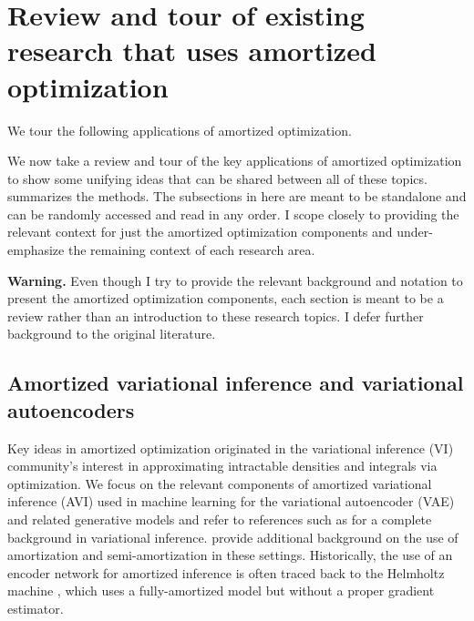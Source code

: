 \documentclass[twoside,11pt]{article}
\begin{document}
\section{Review and tour of existing research that uses amortized optimization}
\label{sec:apps}

\begin{table}[t]
  \caption{We tour the following applications of amortized optimization.}
  \vspace{3mm}
  
  \label{tab:rw}
\end{table}

We now take a review and tour of the key applications
of amortized optimization to show some unifying ideas
that can be shared between all of these topics.
 summarizes the methods.
The subsections in here are meant to be standalone
and can be randomly accessed and read in any order.
I scope closely to providing the relevant context for
just the amortized optimization components and
under-emphasize the remaining context of each research area.

\textbf{Warning.}
Even though I try to provide the relevant background and notation to
present the amortized optimization components, each section is
meant to be a review rather than an introduction to
these research topics.
I defer further background to the original literature.

\subsection{Amortized variational inference and
  variational autoencoders}
\label{sec:apps:avi}
Key ideas in amortized optimization originated in the
variational inference (VI) community's interest in
approximating intractable densities and integrals
via optimization.
We focus on the relevant components of amortized
variational inference (AVI) used in machine learning
for the variational autoencoder (VAE) and
related generative models
\citep{kingma2013auto,rezende2014stochastic,mnih2014neural,rezende2015variational,higgins2016beta,doersch2016tutorial,kingma2019introduction}
and refer to references such as
\citet{jordan1999introduction,wainwright2008graphical,blei2017variational}
for a complete background in variational inference.
\citet{kim2020deep,marino2021learned} provide additional background
on the use of amortization and semi-amortization in these settings.
Historically, the use of an encoder network for amortized inference
is often traced back to the Helmholtz machine \citep{dayan1995helmholtz},
which uses a fully-amortized model but without a proper gradient estimator.
\end{document}
